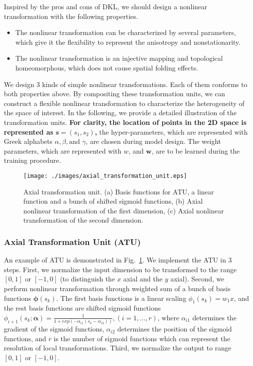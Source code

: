 \documentclass[journal, oneside, twocolumn]{IEEEtran}
\newcommand{\bl}[1]{\bf\color{blue}#1}
\begin{document}
Inspired by the pros and cons of DKL, we should design a nonlinear transformation with the following properties.
\begin{itemize}
  \item The nonlinear transformation can be characterized by several parameters, which give it the flexibility to represent the anisotropy and nonstationarity.
  \item The nonlinear transformation is an injective mapping and topological homeomorphous, which does not cause spatial folding effects.
\end{itemize} 

We design 3 kinds of simple nonlinear transformations. Each of them conforms to both properties above. By compositing these transformation units, we can construct a flexible nonlinear transformation to characterize the heterogeneity of the space of interest. In the following, we provide a detailed illustration of the transformation units. {\bl For clarity, the location of points in the 2D space is represented as $\mathbf{s}= (s_1, s_2)$,} the hyper-parameters, which are represented with Greek alphabets $\alpha, \beta, \text{and } \gamma$, are chosen during model design. The weight parameters, which are represented with $w$, and $\mathbf{w}$, are to be learned during the training procedure.

\begin{figure}[!tb]
  \centering
  \texttt{[image: ./images/axial\_transformation\_unit.eps]}
  \caption{Axial transformation unit. (a) Basis functions for ATU, a linear function and a bunch of shifted sigmoid functions, (b) Axial nonlinear transformation of the first dimension, (c) Axial nonlinear transformation of the second dimension.}
  \label{fig:axial_trans_unit}
\end{figure}

\subsubsection{Axial Transformation Unit (ATU)}
An example of ATU is demonstrated in Fig.~\ref{fig:axial_trans_unit}.
We implement the ATU in 3 steps.
First, we normalize the input dimension to be transformed to the range $[0, 1]$ or $[-1, 0]$ (to distinguish the $x$ axial and the $y$ axial). 
Second, we perform nonlinear transformation through weighted sum of a bunch of basis functions $\boldsymbol{\phi}(s_k)$. The first basis functions is a linear scaling $\phi_1(s_k) = w_1x$, and the rest basis functions are shifted sigmoid functions $\phi_{i+1}(s_k; \boldsymbol{\alpha}) = \frac{1}{1 + exp(-\alpha_{i1}(s_k - \alpha_{i2}))},(i=1,\dots, r)$, where $\alpha_{i1}$ determines the gradient of the sigmoid functions, $\alpha_{i2}$ determines the position of the sigmoid functions, and $r$ is the number of sigmoid functions which can represent the resolution of local transformations. Third, we normalize the output to range $[0,1]$ or $[-1, 0]$.
\end{document}
